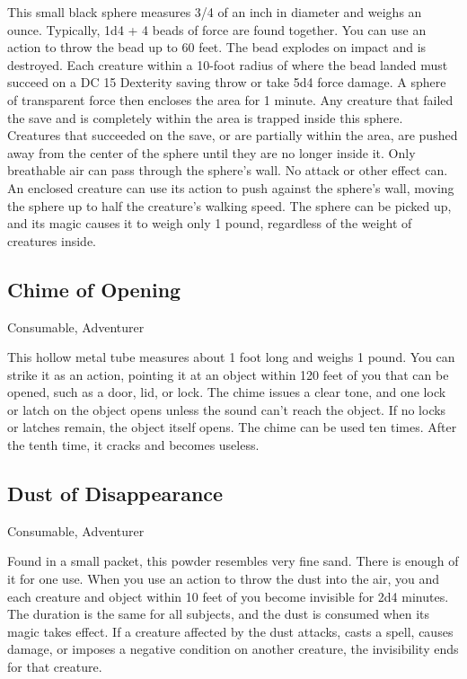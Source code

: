 This small black sphere measures 3/4 of an inch in diameter and weighs an ounce. Typically, 1d4 + 4 beads of force are found together.  You can use an action to throw the bead up to 60 feet. The bead explodes on impact and is destroyed. Each creature within a 10-foot radius of where the bead landed must succeed on a DC 15 Dexterity saving throw or take 5d4 force damage. A sphere of transparent force then encloses the area for 1 minute. Any creature that failed the save and is completely within the area is trapped inside this sphere. Creatures that succeeded on the save, or are partially within the area, are pushed away from the center of the sphere until they are no longer inside it. Only breathable air can pass through the sphere's wall. No attack or other effect can. An enclosed creature can use its action to push against the sphere's wall, moving the sphere up to half the creature's walking speed. The sphere can be picked up, and its magic causes it to weigh only 1 pound, regardless of the weight of creatures inside.

\subsection{Chime of Opening}
Consumable, Adventurer

This hollow metal tube measures about 1 foot long and weighs 1 pound. You can strike it as an action, pointing it at an object within 120 feet of you that can be opened, such as a door, lid, or lock. The chime issues a clear tone, and one lock or latch on the object opens unless the sound can't reach the object. If no locks or latches remain, the object itself opens. The chime can be used ten times. After the tenth time, it cracks and becomes useless.

\subsection{Dust of Disappearance}
Consumable, Adventurer

Found in a small packet, this powder resembles very fine sand. There is enough of it for one use. When you use an action to throw the dust into the air, you and each creature and object within 10 feet of you become invisible for 2d4 minutes. The duration is the same for all subjects, and the dust is consumed when its magic takes effect. If a creature affected by the dust attacks, casts a spell, causes damage, or imposes a negative condition on another creature, the invisibility ends for that creature.

